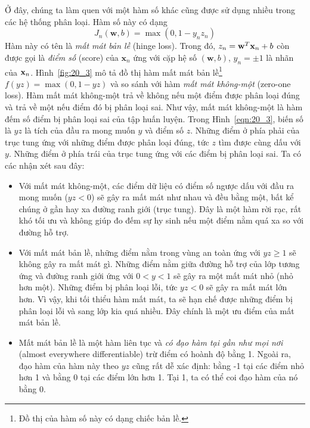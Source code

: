 Ở đây, chúng ta làm quen với một hàm số khác cũng được sử dụng nhiều trong các hệ thống phân loại. Hàm số này có dạng
\begin{equation*}
J_n(\mathbf{w}, b) = \max(0, 1 - y_nz_n)
\end{equation*}
Hàm này có tên là \textit{mất mát bản lề} (hinge loss). Trong đó, $z_n = \mathbf{w}^T\mathbf{x}_n + b$ còn được gọi là \textit{điểm số} (score) của $\mathbf{x}_n$ ứng với cặp hệ số $(\mathbf{w},
b)$, $y_n = \pm 1$ là nhãn của $\mathbf{x}_n$. Hình~\ref{fig:20_3} mô tả đồ thị hàm mất mát bản lề\footnote{Đồ thị của hàm số này có dạng chiếc bản lề.} $f(yz) = \max(0, 1 - yz)$ và
so sánh với hàm \textit{mất mát không-một}
({zero-one loss}). Hàm mất mát không-một trả về không nếu một điểm được phân loại đúng và trả về một nếu điểm đó bị phân loại sai. Như vậy, mất mát không-một là hàm {đếm số điểm bị
phân loại sai} của tập huấn luyện. Trong Hình~\ref{eqn:20_3}, biến số là $yz$ là tích của đầu ra
mong muốn $y$ và điểm số $z$. Những điểm ở phía phải của trục
tung ứng với những điểm được phân loại đúng, tức $z$ tìm được cùng dấu với $y$.
Những điểm ở phía trái của trục tung ứng với các điểm bị phân loại sai. Ta có
các nhận xét sau đây:
\begin{itemize}
\item Với mất mát không-một, các điểm dữ liệu có điểm số ngược dấu
với đầu ra mong muốn ($yz < 0$) sẽ gây ra mất mát như nhau và đều bằng một, bất kể
chúng ở gần hay xa đường ranh giới (trục tung). Đây là một hàm rời rạc, rất
khó tối ưu và không giúp đo đếm sự hy sinh nếu một điểm nằm quá xa so với đường hỗ trợ.

\item Với mất mát bản lề, những điểm nằm trong vùng an toàn ứng
với $yz \geq 1$ sẽ không gây ra mất mát gì. Những điểm nằm giữa đường hỗ trợ của
lớp tương ứng và đường ranh giới ứng với $0 < y < 1$ sẽ gây
ra một mất mát nhỏ (nhỏ hơn một). Những điểm bị phân loại lỗi, tức $yz
< 0$ sẽ gây ra mất mát lớn hơn. Vì vậy, khi tối thiểu hàm mất mát, ta sẽ
hạn chế được những điểm bị phân loại lỗi và sang lớp kia quá nhiều. Đây chính là một ưu điểm của mất mát bản lề.

\item Mất mát bản lề là một hàm liên tục và \textit{có đạo hàm tại gần
như mọi nơi} ({almost everywhere differentiable}) trừ điểm có hoành độ bằng 1. Ngoài ra, đạo hàm của hàm này theo $yz$ cũng rất dễ xác định: bằng -1 tại các điểm nhỏ hơn 1 và bằng 0 tại các điểm lớn hơn 1. Tại 1, ta có thể coi đạo hàm của nó bằng 0.
\end{itemize}


